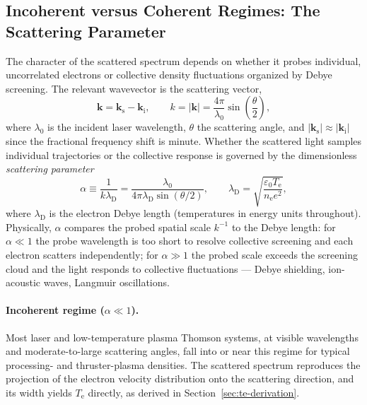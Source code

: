 \subsection{Incoherent versus Coherent Regimes: The Scattering Parameter}

The character of the scattered spectrum depends on whether it probes individual, uncorrelated electrons or collective density fluctuations organized by Debye screening. The relevant wavevector is the scattering vector,
\begin{equation}
\mathbf{k} = \mathbf{k}_{\mathrm{s}} - \mathbf{k}_{\mathrm{i}}, \qquad
k = |\mathbf{k}| = \frac{4\pi}{\lambda_{0}}\sin\!\left(\frac{\theta}{2}\right),
\label{eq:scattering-vector}
\end{equation}
where $\lambda_{0}$ is the incident laser wavelength, $\theta$ the scattering angle, and $|\mathbf{k}_{\mathrm{s}}|\approx|\mathbf{k}_{\mathrm{i}}|$ since the fractional frequency shift is minute. Whether the scattered light samples individual trajectories or the collective response is governed by the dimensionless \emph{scattering parameter}
\begin{equation}
\alpha \equiv \frac{1}{k\lambda_{\mathrm{D}}}
= \frac{\lambda_{0}}{4\pi\lambda_{\mathrm{D}}\sin(\theta/2)},
\qquad
\lambda_{\mathrm{D}} = \sqrt{\frac{\varepsilon_{0} T_{\mathrm{e}}}{n_{\mathrm{e}} e^{2}}},
\label{eq:scattering-parameter}
\end{equation}
where $\lambda_{\mathrm{D}}$ is the electron Debye length (temperatures in energy units throughout). Physically, $\alpha$ compares the probed spatial scale $k^{-1}$ to the Debye length: for $\alpha\ll1$ the probe wavelength is too short to resolve collective screening and each electron scatters independently; for $\alpha\gg1$ the probed scale exceeds the screening cloud and the light responds to collective fluctuations — Debye shielding, ion-acoustic waves, Langmuir oscillations.

\paragraph{Incoherent regime ($\alpha \ll 1$).} Most laser and low-temperature plasma Thomson systems, at visible wavelengths and moderate-to-large scattering angles, fall into or near this regime for typical processing- and thruster-plasma densities. The scattered spectrum reproduces the projection of the electron velocity distribution onto the scattering direction, and its width yields $T_{\mathrm{e}}$ directly, as derived in Section~\ref{sec:te-derivation}.

